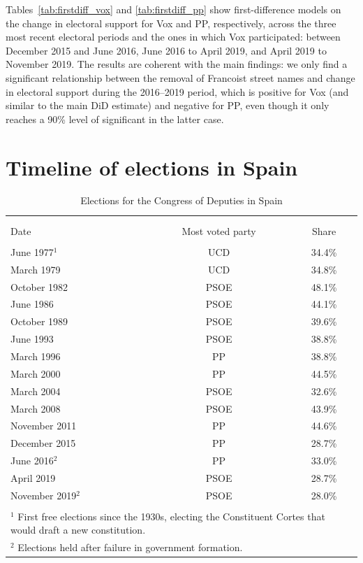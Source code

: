 \documentclass[12pt, titlepage]{article}
\begin{document}
Tables~\ref{tab:firstdiff_vox} and \ref{tab:firstdiff_pp} show first-difference models on the change in electoral support for Vox and PP, respectively, across the three most recent electoral periods and the ones in which Vox participated: between December 2015 and June 2016, June 2016 to April 2019, and April 2019 to November 2019.
The results are coherent with the main findings: we only find a significant relationship between the removal of Francoist street names and change in electoral support during the 2016--2019 period, which is positive for Vox (and similar to the main DiD estimate) and negative for PP, even though it only reaches a 90\% level of significant in the latter case.




\clearpage
\section{Timeline of elections in Spain}\label{app:timeline_elections}

\begin{table}[!htbp] \centering
\caption{Elections for the Congress of Deputies in Spain}
\label{tab:elections}
\small
\begin{tabular}{lcc}
\\[-1.8ex]\hline
\hline \\[-1.8ex]
\\[-1.8ex]
Date & Most voted party & Share \\
\hline \\[-1.8ex]
June 1977$^1$ & UCD & 34.4\% \\
March 1979 & UCD & 34.8\% \\
October 1982 & PSOE & 48.1\% \\
June 1986 & PSOE & 44.1\% \\
October 1989 & PSOE & 39.6\% \\
June 1993 & PSOE & 38.8\% \\
March 1996 & PP & 38.8\% \\
March 2000 & PP & 44.5\% \\
March 2004 & PSOE & 32.6\% \\
March 2008 & PSOE & 43.9\% \\
November 2011 & PP & 44.6\% \\
December 2015 & PP & 28.7\% \\
June 2016$^2$ & PP & 33.0\% \\
April 2019 & PSOE & 28.7\% \\
November 2019$^2$ & PSOE & 28.0\% \\
\hline
\hline \\[-1.8ex]
\multicolumn{3}{p{8.5cm}}{\footnotesize $^1$ First free elections since the 1930s, electing the Constituent Cortes that would draft a new constitution.}\\
\multicolumn{3}{p{8.5cm}}{\footnotesize $^2$ Elections held after failure in government formation.}
\end{tabular}
\end{table}
\end{document}
